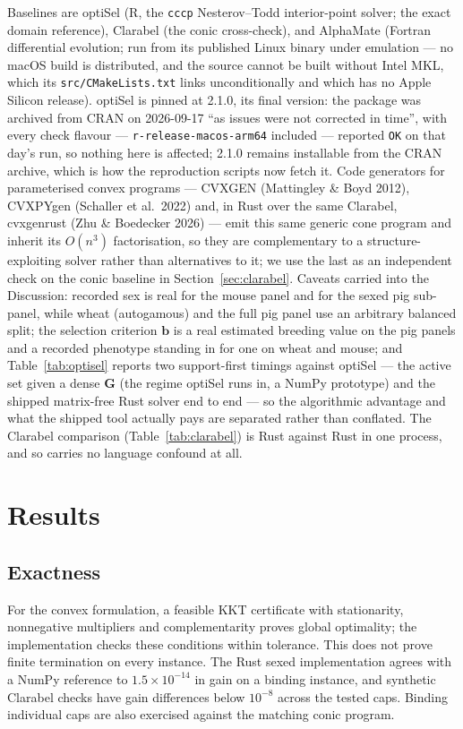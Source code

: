 \documentclass[11pt]{article}
\newcommand{\bb}{\mathbf{b}}
\newcommand{\bG}{\mathbf{G}}
\begin{document}
Baselines are optiSel (R, the \texttt{cccp} Nesterov--Todd interior-point solver; the exact domain reference), Clarabel (the conic cross-check), and AlphaMate (Fortran differential evolution; run from its published Linux binary under emulation --- no macOS build is distributed, and the source cannot be built without Intel MKL, which its \texttt{src/CMakeLists.txt} links unconditionally and which has no Apple Silicon release). optiSel is pinned at 2.1.0, its final version: the package was archived from CRAN on 2026-09-17 ``as issues were not corrected in time'', with every check flavour --- \texttt{r-release-macos-arm64} included --- reported \texttt{OK} on that day's run, so nothing here is affected; 2.1.0 remains installable from the CRAN archive, which is how the reproduction scripts now fetch it. Code generators for parameterised convex programs --- CVXGEN (Mattingley \& Boyd 2012), CVXPYgen (Schaller et al.\ 2022) and, in Rust over the same Clarabel, cvxgenrust (Zhu \& Boedecker 2026) --- emit this same generic cone program and inherit its $O(n^3)$ factorisation, so they are complementary to a structure-exploiting solver rather than alternatives to it; we use the last as an independent check on the conic baseline in Section~\ref{sec:clarabel}. Caveats carried into the Discussion: recorded sex is real for the mouse panel and for the sexed pig sub-panel, while wheat (autogamous) and the full pig panel use an arbitrary balanced split; the selection criterion $\bb$ is a real estimated breeding value on the pig panels and a recorded phenotype standing in for one on wheat and mouse; and Table~\ref{tab:optisel} reports two support-first timings against optiSel --- the active set given a dense $\bG$ (the regime optiSel runs in, a NumPy prototype) and the shipped matrix-free Rust solver end to end --- so the algorithmic advantage and what the shipped tool actually pays are separated rather than conflated. The Clarabel comparison (Table~\ref{tab:clarabel}) is Rust against Rust in one process, and so carries no language confound at all.

\section{Results}

\subsection{Exactness}\label{sec:exactness}

For the convex formulation, a feasible KKT certificate with stationarity, nonnegative multipliers and complementarity proves global optimality; the implementation checks these conditions within tolerance. This does not prove finite termination on every instance. The Rust sexed implementation agrees with a NumPy reference to $1.5\times10^{-14}$ in gain on a binding instance, and synthetic Clarabel checks have gain differences below $10^{-8}$ across the tested caps. Binding individual caps are also exercised against the matching conic program.
\end{document}
